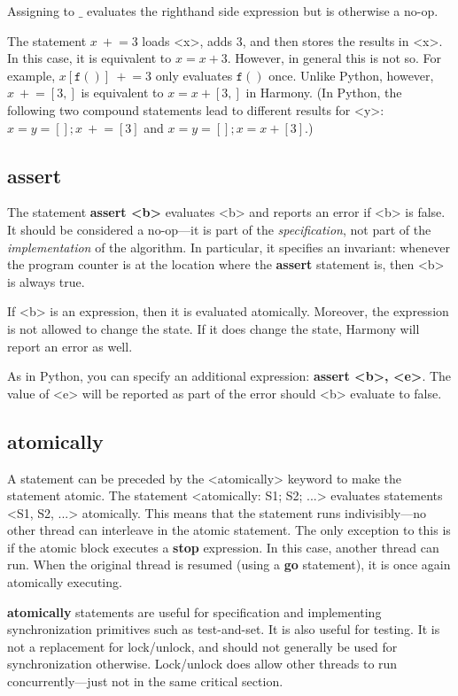 \documentclass{report}
\begin{document}
Assigning to $\_$ evaluates the righthand side expression but is otherwise
a no-op.

The statement $x~+$$= 3$ loads <{x}>, adds 3, and then stores the
results in <{x}>.  In this case, it is equivalent to $x = x + 3$.
However, in general this is not so.  For example, $x[\mathtt{f}()]~+$$= 3$
only evaluates $\mathtt{f}()$ once.  Unlike Python, however,
$x~+$$= [3,]$ is equivalent to $x = x + [3,]$ in Harmony.
(In Python, the following two compound statements lead to different results
for <{y}>: $x = y = []; x~+$$= [3]$ and $x = y = []; x = x + [3]$.)

\subsection*{\textbf{assert}}

The statement \textbf{assert <{b}>} evaluates <{b}> and reports an error
if <{b}> is false.  It should be considered a no-op---it is part of the
\emph{specification}, not part of the \emph{implementation} of the algorithm.
In particular, it specifies an invariant: whenever the program counter is
at the location where the \textbf{assert} statement is, then <{b}> is
always true.

If <{b}> is an expression, then it is evaluated atomically.
Moreover, the expression is not allowed to change the state.
If it does change the state, Harmony will report an error as well.

As in Python, you can specify an additional expression:
\textbf{assert <{b}>, <{e}>}.  The value of <{e}> will be reported as part
of the error should <{b}> evaluate to false.

\subsection*{\textbf{atomically}}

A statement can be preceded by the <{atomically}> keyword to
make the statement atomic.
The statement <{atomically: S1; S2; ...}> evaluates statements
<{S1, S2, ...}> atomically.
This means that the statement runs indivisibly---no other thread can
interleave in the atomic statement.  The only exception
to this is if the atomic block executes a \textbf{stop} expression.
In this case, another thread can run.  When the original thread
is resumed (using a \textbf{go} statement), it is once again
atomically executing.

\textbf{atomically} statements are useful for specification and
implementing synchronization primitives such as test-and-set.
It is also useful for testing.
It is not a replacement for lock/unlock, and should not generally be used
for synchronization otherwise.  Lock/unlock does allow other
threads to run concurrently---just not in the same critical section.
\end{document}

